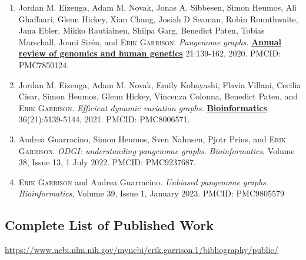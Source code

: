 \documentclass{nihbiosketch}
\newcommand{\hijournal}[1]{{\bf {\uline{#1}}}}
\begin{document}
\begin{enumerate}
  \begin{enumerate}

    \item Jordan M. Eizenga, Adam M. Novak, Jonas A. Sibbesen, Simon Heumos, Ali Ghaffaari, Glenn Hickey, Xian Chang, Josiah D Seaman, Robin Rounthwaite, Jana Ebler, Mikko Rautiainen, Shilpa Garg, Benedict Paten, Tobias Marschall, Jouni Sirén, and \textsc{Erik Garrison}. \emph{Pangenome graphs.} \hijournal{Annual review of genomics and human genetics} 21:139-162, 2020. PMCID: PMC7850124.

  \item Jordan M. Eizenga, Adam M. Novak, Emily Kobayashi, Flavia Villani, Cecilia Cisar, Simon Heumos, Glenn Hickey, Vincenza Colonna, Benedict Paten, and \textsc{Erik Garrison}. \emph{Efficient dynamic variation graphs.} \hijournal{Bioinformatics} 36(21):5139-5144, 2021. PMCID: PMC8006571.

  \item Andrea Guarracino, Simon Heumos, Sven Nahnsen, Pjotr Prins, and \textsc{Erik Garrison}. \emph{ODGI: understanding pangenome graphs}. \emph{Bioinformatics},  Volume 38, Issue 13, 1 July 2022. PMCID: PMC9237687.

  \item \textsc{Erik Garrison} and Andrea Guarracino. \emph{Unbiased pangenome graphs}. \emph{Bioinformatics}, Volume 39, Issue 1, January 2023. PMCID: PMC9805579

  \end{enumerate}

\end{enumerate}

\subsection*{Complete List of Published Work}

\begin{datetbl}
  \url{https://www.ncbi.nlm.nih.gov/myncbi/erik.garrison.1/bibliography/public/}
\end{datetbl}


\end{document}
